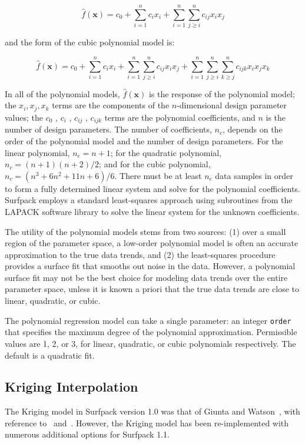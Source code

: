 \documentclass{article}
\begin{document}
\begin{equation}
  \hat{f}(\mathbf{x}) = c_{0}+\sum_{i=1}^{n}c_{i}x_{i}
  +\sum_{i=1}^{n}\sum_{j \ge i}^{n}c_{ij}x_{i}x_{j}
  \label{models:surf:equation02}
\end{equation}

and the form of the cubic polynomial model is:

\begin{equation}
  \hat{f}(\mathbf{x}) = c_{0}+\sum_{i=1}^{n}c_{i}x_{i}
  +\sum_{i=1}^{n}\sum_{j \ge i}^{n}c_{ij}x_{i}x_{j}
  +\sum_{i=1}^{n}\sum_{j \ge i}^{n}\sum_{k \ge j}^{n}
  c_{ijk}x_{i}x_{j}x_{k}
  \label{models:surf:equation03}
\end{equation}

In all of the polynomial models, $\hat{f}(\mathbf{x})$ is the response
of the polynomial model; the $x_{i},x_{j},x_{k}$ terms are the
components of the $n$-dimensional design parameter values; the $c_{0}$
, $c_{i}$ , $c_{ij}$ , $c_{ijk} $ terms are the polynomial
coefficients, and $n$ is the number of design parameters.  The number
of coefficients, $n_{c}$, depends on the order of the polynomial model and
the number of design parameters. For the linear polynomial, $n_c =n+1$;
for the quadratic polynomial, $n_c = (n+1)(n+2)/2$;
and for the cubic polynomial, $n_c = (n^{3}+6 n^{2}+11 n+6)/6$.
There must be at least $n_{c}$ data samples in order to form a fully
determined linear system and solve for the polynomial coefficients. 
Surfpack employs a standard least-squares approach using subroutines from the LAPACK software library to solve the linear system for the unknown coefficients.

The utility of the polynomial models stems from two sources: (1) over
a small region of the parameter space, a low-order polynomial model
is often an accurate approximation to the true data trends, and (2)
the least-squares procedure provides a surface fit that smooths out
noise in the data.  However, a polynomial surface fit may
not be the best choice for modeling data trends over the entire
parameter space, unless it is known a priori that the true data trends
are close to linear, quadratic, or cubic.

The polynomial regression model can take a single parameter: an integer \texttt{order} that specifies the maximum degree of the polynomial approximation.  Permissible values are 1, 2, or 3, for linear, quadratic, or cubic polynomials respectively.  The default is a quadratic fit.


\subsection{Kriging Interpolation }\label{models:surf:kriging}
The Kriging model in Surfpack version 1.0 was that of Giunta and
Watson~\cite{giunta}, with reference to~\cite{romero}
and~\cite{koehler}. However, the Kriging model has been re-implemented
with numerous additional options for Surfpack 1.1.\newline
\end{document}
